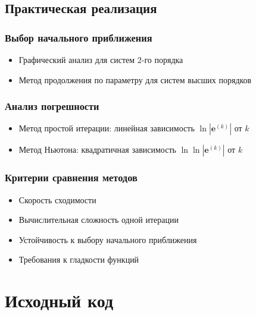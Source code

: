 \subsection*{Практическая реализация}

\subsubsection*{Выбор начального приближения}
\begin{itemize}
\item Графический анализ для систем 2-го порядка
\item Метод продолжения по параметру для систем высших порядков
\end{itemize}

\subsubsection*{Анализ погрешности}
\begin{itemize}
\item Метод простой итерации: линейная зависимость $\ln|\mathbf{e}^{(k)}|$ от $k$
\item Метод Ньютона: квадратичная зависимость $\ln\ln|\mathbf{e}^{(k)}|$ от $k$
\end{itemize}

\subsubsection*{Критерии сравнения методов}
\begin{itemize}
\item Скорость сходимости
\item Вычислительная сложность одной итерации
\item Устойчивость к выбору начального приближения
\item Требования к гладкости функций
\end{itemize}

\section*{Исходный код}

